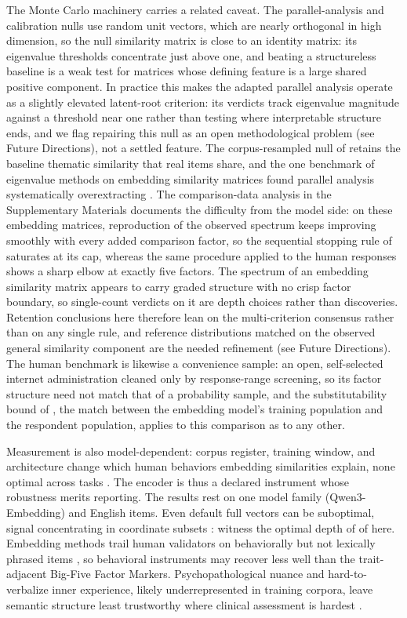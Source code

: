 The Monte Carlo machinery carries a related caveat. The
parallel-analysis and calibration nulls use random unit vectors, which
are nearly orthogonal in high dimension, so the null similarity matrix is
close to an identity matrix: its eigenvalue thresholds concentrate just
above one, and beating a structureless baseline is a weak test for
matrices whose defining feature is a large shared positive component.
In practice this makes the adapted parallel analysis operate as a
slightly elevated latent-root criterion: its verdicts track eigenvalue
magnitude against a threshold near one rather than testing where
interpretable structure ends, and we flag repairing this null as an
open methodological problem (see Future Directions), not a settled
feature.
The corpus-resampled null of \citet{pokropek-2026} retains the baseline
thematic similarity that real items share, and the one benchmark of
eigenvalue methods on embedding similarity matrices found parallel
analysis systematically overextracting \citep{garrido-etal-2025}.
The comparison-data analysis in the Supplementary Materials documents
the difficulty from the model side: on these embedding matrices,
reproduction of the observed spectrum keeps improving smoothly with
every added comparison factor, so the sequential stopping rule of
\citet{ruscio-roche-2012} saturates at its cap, whereas the same
procedure applied to the human responses shows a sharp elbow at exactly
five factors. The spectrum of an embedding similarity matrix appears to
carry graded structure with no crisp factor boundary, so single-count
verdicts on it are depth choices rather than discoveries.
Retention conclusions here therefore lean on the multi-criterion
consensus rather than on any single rule, and reference distributions
matched on the observed general similarity component are the needed
refinement (see Future Directions). The human benchmark is likewise a
convenience sample: an open, self-selected internet administration
\citep{openpsychometrics-2018} cleaned only by response-range screening,
so its factor structure need not match that of a probability sample, and
the substitutability bound of \citet{guenole-etal-2025}, the match
between the embedding model's training population and the respondent
population, applies to this comparison as to any other.

Measurement is also model-dependent: corpus register, training window,
and architecture change which human behaviors embedding similarities
explain, none optimal across tasks
\citep{mandera-etal-2017}. The encoder is thus a declared instrument
whose robustness merits reporting. The results rest on one model family
(Qwen3-Embedding) and English items. Even default full vectors can be
suboptimal, signal concentrating in coordinate subsets
\citep{golino-2026}: witness the optimal depth of \valDepthOpt{} of \valDepthFull
here. Embedding methods trail human validators on behaviorally but not
lexically phrased items \citep{milano-etal-2025b}, so behavioral
instruments may recover less well than the trait-adjacent Big-Five Factor
Markers. Psychopathological nuance and hard-to-verbalize inner
experience, likely underrepresented in training corpora, leave semantic
structure least trustworthy where clinical assessment is hardest
\citep{kambeitz-etal-2025}.

